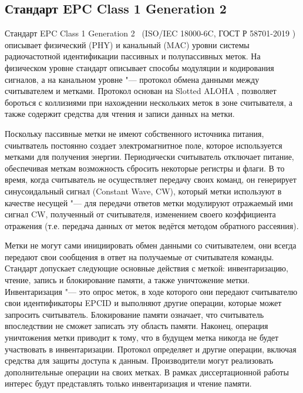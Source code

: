 \subsection{Стандарт EPC Class 1 Generation 2}\label{sec:ch1_rfid_std}

Стандарт EPC Class 1 Generation 2~\cite{StdGen2} (ISO/IEC 18000-6C, ГОСТ Р 58701-2019 \cite{GostRfid}) описывает физический (PHY) и канальный (MAC) уровни системы радиочастотной идентификации пассивных и полупассивных меток. На физическом уровне стандарт описывает способы модуляции и кодирования сигналов, а на канальном уровне "--- протокол обмена данными между считывателем и метками. Протокол основан на Slotted ALOHA \cite{Abramson1970, Roberts1975}, позволяет бороться с коллизиями при нахождении нескольких меток в зоне считывателя, а также содержит средства для чтения и записи данных на метки.

Поскольку пассивные метки не имеют собственного источника питания, счиытватель постоянно создает электромагнитное поле, которое используется метками для получения энергии. Периодически считыватель отключает питание, обеспечивая меткам возможность сбросить некоторые регистры и флаги. В то время, когда считыватель не осуществляет передачу своих команд, он генерирует синусоидальный сигнал (Constant Wave, CW), который метки используют в качестве несущей "--- для передачи ответов метки модулируют отражаемый ими сигнал CW, полученный от считывателя, изменением своего коэффициента отражения (т.е. передача данных от меток ведётся методом обратного рассеяния).

Метки не могут сами инициировать обмен данными со считывателем, они всегда передают свои сообщения в ответ на получаемые от считывателя команды. Стандарт допускает следующие основные действия с меткой: инвентаризацию, чтение, запись и блокирование памяти, а также уничтожение метки. Инвентаризация "--- это опрос меток, в ходе которого они передают считывателю свои идентификаторы EPCID и выполняют другие операции, которые может запросить считыватель.  Блокирование памяти означает, что считыватель впоследствии не сможет записать эту область памяти. Наконец, операция уничтожения метки приводит к тому, что в будущем метка никогда не будет участвовать в инвентаризации. Протокол определяет и другие операции, включая средства для защиты доступа к данным. Производители могут реализовать дополнительные операции на своих метках. В рамках диссертационной работы интерес будут представлять только инвентаризация и чтение памяти.


